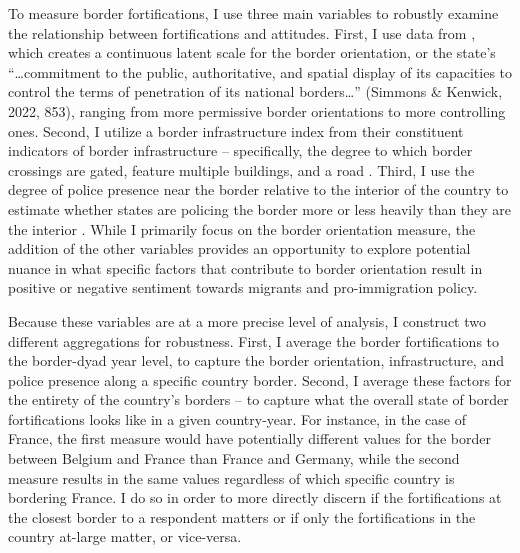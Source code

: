 \documentclass[12pt,]{article}
\begin{document}
To measure border fortifications, I use three main variables to robustly
examine the relationship between fortifications and attitudes. First, I
use data from \citet{simmons2022}, which creates a continuous latent
scale for the border orientation, or the state's ``\ldots commitment to
the public, authoritative, and spatial display of its capacities to
control the terms of penetration of its national borders\ldots{}''
(Simmons \& Kenwick, 2022, 853), ranging from more permissive border
orientations to more controlling ones. Second, I utilize a border
infrastructure index from their constituent indicators of border
infrastructure -- specifically, the degree to which border crossings are
gated, feature multiple buildings, and a road \citep{simmons2022}.
Third, I use the degree of police presence near the border relative to
the interior of the country to estimate whether states are policing the
border more or less heavily than they are the interior
\citep{simmons2022}. While I primarily focus on the border orientation
measure, the addition of the other variables provides an opportunity to
explore potential nuance in what specific factors that contribute to
border orientation result in positive or negative sentiment towards
migrants and pro-immigration policy.

Because these variables are at a more precise level of analysis, I
construct two different aggregations for robustness. First, I average
the border fortifications to the border-dyad year level, to capture the
border orientation, infrastructure, and police presence along a specific
country border. Second, I average these factors for the entirety of the
country's borders -- to capture what the overall state of border
fortifications looks like in a given country-year. For instance, in the
case of France, the first measure would have potentially different
values for the border between Belgium and France than France and
Germany, while the second measure results in the same values regardless
of which specific country is bordering France. I do so in order to more
directly discern if the fortifications at the closest border to a
respondent matters or if only the fortifications in the country at-large
matter, or vice-versa.
\end{document}
